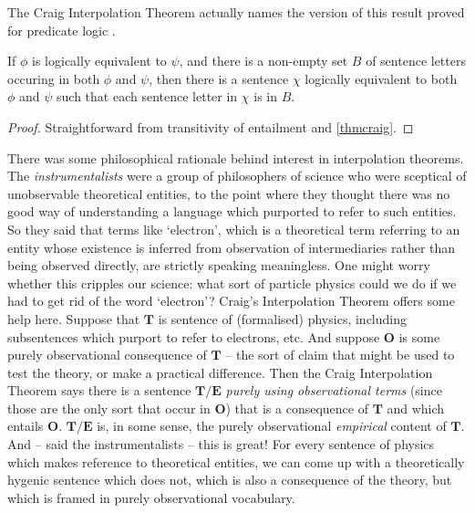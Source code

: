 The Craig Interpolation Theorem actually names the version of this result proved for predicate logic  \citep{crathrush}.
\begin{corol}\label{interpolequiv}
	If $\phi$ is logically equivalent to $\psi$, and there is a non-empty set $B$ of sentence letters occuring in both $\phi$ and $\psi$, then there is a sentence $\chi$ logically equivalent to both $\phi$ and $\psi$ such that each sentence letter in $\chi$ is in $B$. \begin{proof}
		Straightforward from transitivity of entailment and \autoref{thmcraig}.
	\end{proof}
\end{corol}

There was some philosophical rationale behind interest in interpolation theorems. The \emph{instrumentalists} were a group of philosophers of science who were sceptical of unobservable theoretical entities, to the point where they thought there was no good way of understanding a language which purported to refer to such entities. So they said that terms like `electron', which is a theoretical term referring to an entity whose existence is inferred from observation of intermediaries rather than being observed directly, are strictly speaking meaningless. One might worry whether this cripples our science: what sort of particle physics could we do if we had to get rid of the word `electron'? Craig's Interpolation Theorem offers some help here. Suppose that $\mathbf{T}$ is sentence of (formalised) physics, including subsentences which purport to refer to electrons, etc. And suppose $\mathbf{O}$ is some purely observational consequence of $\mathbf{T}$ – the sort of claim that might be used to test the theory, or make a practical difference. Then the Craig Interpolation Theorem says there is a sentence $\mathbf{T}/\mathbf{E}$ \emph{purely using observational terms} (since those are the only sort that occur in $\mathbf{O}$) that is a consequence of $\mathbf{T}$ and which entails $\mathbf{O}$. $\mathbf{T}/\mathbf{E}$ is, in some sense, the purely observational \emph{empirical} content of $\mathbf{T}$. And – said the instrumentalists – this is great! For every sentence of physics which makes reference to theoretical entities, we can come up with a theoretically hygenic sentence which does not, which is also a consequence of the theory, but which is framed in purely observational vocabulary.

